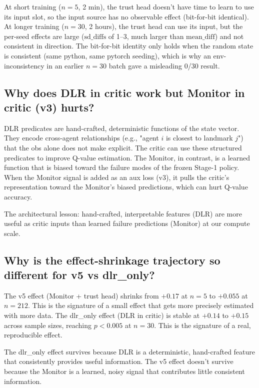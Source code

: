 \documentclass[11pt]{article}
\begin{document}
At short training ($n=5$, 2 min), the trust head doesn't have time
to learn to use its input slot, so the input source has no
observable effect (bit-for-bit identical). At longer training
($n=30$, 2 hours), the trust head can use its input, but the
per-seed effects are large ($\text{sd\_diffs}$ of 1--3, much larger
than $\text{mean\_diff}$) and not consistent in direction. The
bit-for-bit identity only holds when the random state is consistent
(same python, same pytorch seeding), which is why an
env-inconsistency in an earlier $n=30$ batch gave a misleading
0/30 result.

\subsection{Why does DLR in critic work but Monitor in critic (v3) hurts?}

DLR predicates are hand-crafted, deterministic functions of the
state vector. They encode cross-agent relationships (e.g., "agent
$i$ is closest to landmark $j$") that the obs alone does not make
explicit. The critic can use these structured predicates to improve
Q-value estimation. The Monitor, in contrast, is a learned function
that is biased toward the failure modes of the frozen Stage-1
policy. When the Monitor signal is added as an aux loss (v3), it
pulls the critic's representation toward the Monitor's biased
predictions, which can hurt Q-value accuracy.

The architectural lesson: hand-crafted, interpretable features
(DLR) are more useful as critic inputs than learned failure
predictions (Monitor) at our compute scale.

\subsection{Why is the effect-shrinkage trajectory so different for v5 vs dlr\_only?}

The v5 effect (Monitor + trust head) shrinks from $+0.17$ at $n=5$
to $+0.055$ at $n=212$. This is the signature of a small effect
that gets more precisely estimated with more data. The dlr\_only
effect (DLR in critic) is stable at $+0.14$ to $+0.15$ across
sample sizes, reaching $p<0.005$ at $n=30$. This is the signature of
a real, reproducible effect.

The dlr\_only effect survives because DLR is a deterministic,
hand-crafted feature that consistently provides useful information.
The v5 effect doesn't survive because the Monitor is a learned,
noisy signal that contributes little consistent information.
\end{document}
